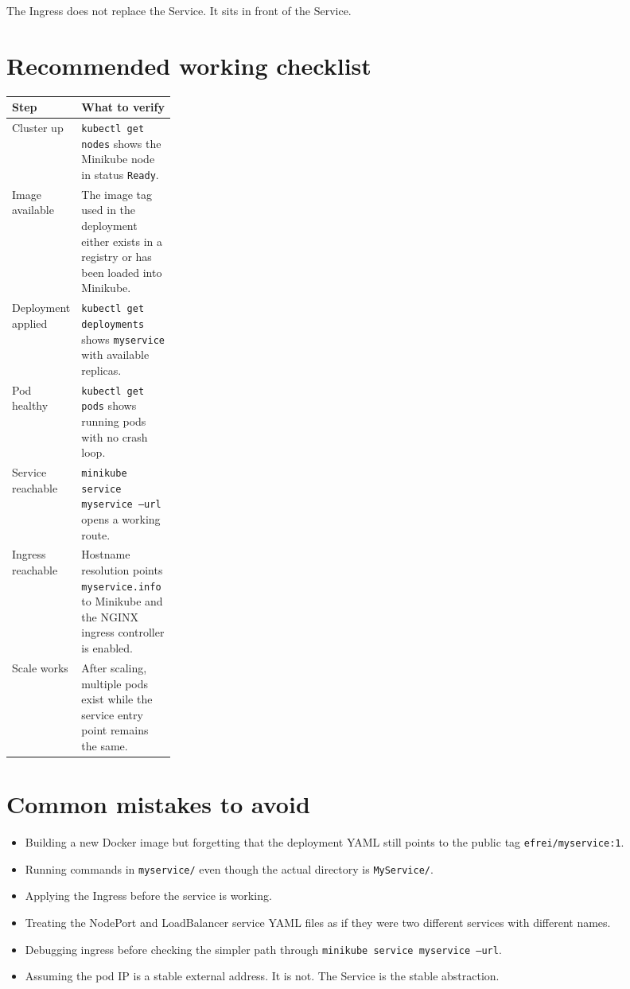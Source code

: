 \documentclass[11pt,a4paper]{article}
\newcommand{\pathitem}[1]{\texorpdfstring{\nolinkurl{#1}}{#1}}
\newcommand{\cmd}[1]{\texttt{#1}}
\begin{document}
The Ingress does not replace the Service. It sits in front of the Service.

\section{Recommended working checklist}

\begin{tabularx}{\linewidth}{@{}p{0.24\linewidth}Y@{}}
\toprule
\textbf{Step} & \textbf{What to verify} \\
\midrule
Cluster up & \cmd{kubectl get nodes} shows the Minikube node in status \cmd{Ready}. \\
Image available & The image tag used in the deployment either exists in a registry or has been loaded into Minikube. \\
Deployment applied & \cmd{kubectl get deployments} shows \cmd{myservice} with available replicas. \\
Pod healthy & \cmd{kubectl get pods} shows running pods with no crash loop. \\
Service reachable & \cmd{minikube service myservice --url} opens a working route. \\
Ingress reachable & Hostname resolution points \cmd{myservice.info} to Minikube and the NGINX ingress controller is enabled. \\
Scale works & After scaling, multiple pods exist while the service entry point remains the same. \\
\bottomrule
\end{tabularx}

\section{Common mistakes to avoid}

\begin{itemize}
\item Building a new Docker image but forgetting that the deployment YAML still points to the public tag \pathitem{efrei/myservice:1}.
\item Running commands in \pathitem{myservice/} even though the actual directory is \pathitem{MyService/}.
\item Applying the Ingress before the service is working.
\item Treating the NodePort and LoadBalancer service YAML files as if they were two different services with different names.
\item Debugging ingress before checking the simpler path through \cmd{minikube service myservice --url}.
\item Assuming the pod IP is a stable external address. It is not. The Service is the stable abstraction.
\end{itemize}
\end{document}
